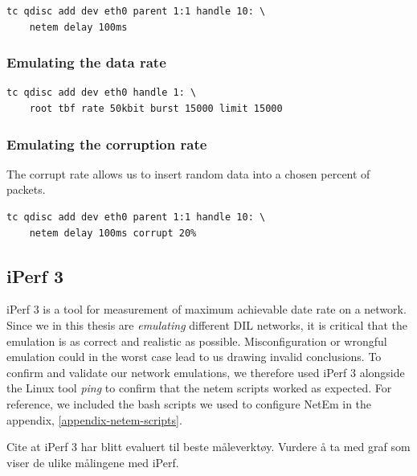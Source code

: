 \begin{lstlisting}[frame=single, caption="Emulating delay", label=listing-netem-delay]
  tc qdisc add dev eth0 parent 1:1 handle 10: \
    netem delay 100ms
\end{lstlisting}

\subsubsection{Emulating the data rate}

\begin{lstlisting}[frame=single, caption="Emulating data rate", label=listing-netem-data-rate]
  tc qdisc add dev eth0 handle 1: \
    root tbf rate 50kbit burst 15000 limit 15000
\end{lstlisting}

\subsubsection{Emulating the corruption rate}

The corrupt rate allows us to insert random data into a chosen percent of
packets.

\begin{lstlisting}[frame=single, caption="Emulating corruption rate", label=listing-netem-error-rate]
  tc qdisc add dev eth0 parent 1:1 handle 10: \
    netem delay 100ms corrupt 20%
\end{lstlisting}


\subsection{iPerf 3}

iPerf 3 is a tool for measurement of maximum achievable date rate on a
network\cite{iperf3-homepage}. Since we in this thesis are \textit{emulating}
different DIL networks, it is critical that the emulation is as correct and
realistic as possible. Misconfiguration or wrongful emulation could in the worst
case lead to us drawing invalid conclusions. To confirm and validate our network
emulations, we therefore used iPerf 3 alongside the Linux tool \textit{ping} to
confirm that the \gls{netem} scripts worked as expected. For reference, we
included the bash scripts we used to configure NetEm in the appendix,
\cref{appendix-netem-scripts}.

Cite at iPerf 3 har blitt evaluert til beste måleverktøy. Vurdere å ta med graf som viser de ulike målingene med iPerf.

